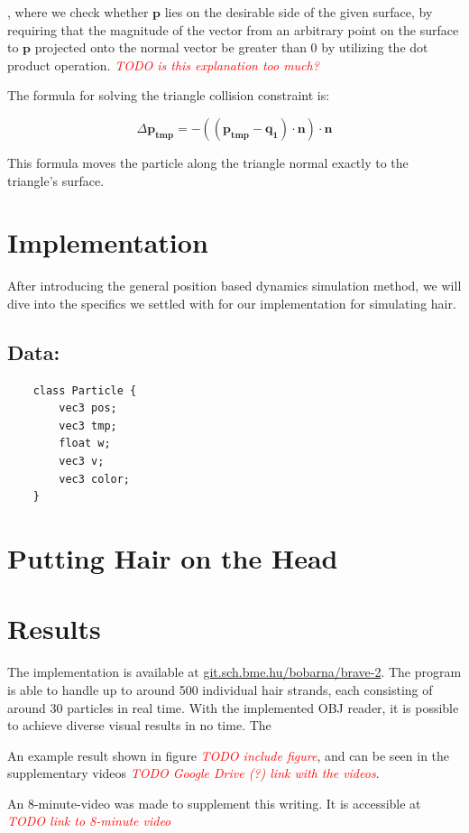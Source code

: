 \documentclass[sigplan,screen,nonacm]{acmart}
\newcommand\TODO[1]{\textcolor{red}{\emph{TODO #1}}}
\renewcommand{\b}{\boldsymbol}
\begin{document}
, where we check whether $\b{p}$ lies on the desirable side of the given
surface, by requiring that the magnitude of the vector from an arbitrary point
on the surface to $\b{p}$ projected onto the normal vector be greater than 0 by
utilizing the dot product operation.
\TODO{is this explanation too much?}

The formula for solving the triangle collision constraint is:

$$
\Delta \b{p_{tmp}} = -((\b{p_{tmp}}-\b{q_1})\cdot \b{n})\cdot \b{n}
$$

This formula moves the particle along the triangle normal exactly to the
triangle's surface. 

\section{Implementation}
After introducing the general position based dynamics simulation method, we will
dive into the specifics we settled with for our implementation for simulating
hair.

\subsection{Data:}

\begin{verbatim}
    class Particle {
        vec3 pos;
        vec3 tmp;
        float w;
        vec3 v;
        vec3 color;
    }
\end{verbatim}

\section{Putting Hair on the Head}


\section{Results}
The implementation is available at \url{git.sch.bme.hu/bobarna/brave-2}. The
program is able to handle up to around 500 individual hair strands, each
consisting of around 30 particles in real time. With the implemented OBJ reader,
it is possible to achieve diverse visual results in no time. The 

An example result shown in figure \TODO{include figure}, and can be seen in the
supplementary videos \TODO{Google Drive (?) link with the videos}.

An 8-minute-video was made to supplement this writing. It is accessible at
\TODO{link to 8-minute video}
\end{document}
